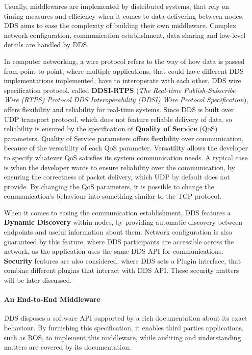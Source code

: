 Usually, middlewares are implemented by distributed systems, that rely on timing-measures and efficiency when it comes to data-delivering between nodes. DDS aims to ease the complexity of building their own middleware. Complex network configuration, communication establishment, data sharing and low-level details are handled by DDS.

In computer networking, a wire protocol refers to the way of how data is passed from point to point, where multiple applications, that could have different DDS implementations implemented, have to interoperate with each other. DDS wire specification protocol, called \textbf{DDSI-RTPS} (\textit{The Real-time Publish-Subscribe Wire (RTPS) Protocol DDS Interoperability (DDSI) Wire Protocol Specification}), offers flexibility and reliability for real-time systems. Since DDS is built over UDP transport protocol, which does not feature reliable delivery of data, so reliability is ensured by the specification of \textbf{Quality of Service} (QoS) parameters. Quality of Service parameters offers flexibility over communication, because of the versatility of each QoS parameter. Versatility allows the developer to specify whatever QoS satisfies its system communication needs. A typical case is when the developer wants to ensure reliability over the communication, by ensuring the correctness of packet delivery, which UDP by default does not provide. By changing the QoS parameters, it is possible to change the communication's behaviour into something similar to the TCP protocol.  


When it comes to easing the communication establishment, DDS features a \textbf{Dynamic Discovery} within nodes, by providing automatic discovery between endpoints and useful information about them. Network configuration is also guaranteed by this feature, where DDS participants are accessible across the network, as the application uses the same DDS API for communications. \textbf{Security} features are also considered, where DDS sets a Plugin interface, that combine different plugins that interact with DDS API. These security matters will be later discussed.

\paragraph{An End-to-End Middleware}

DDS disposes a software API supported by a rich documentation about its exact behaviour. By furnishing this specification, it enables third parties applications, such as ROS, to implement this middleware, while auditing and understanding matters are covered by its documentation.

